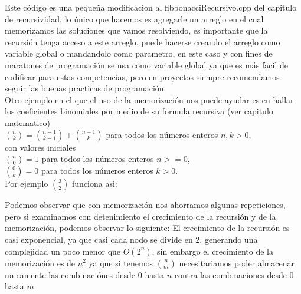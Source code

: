 Este código es una pequeña modificacion al fibbonacciRecursivo.cpp del capitulo de recursividad, lo único que hacemos es agregarle un arreglo en el cual memorizamos las soluciones que vamos resolviendo, es importante que la recursión tenga acceso a este arreglo, puede hacerse creando el arreglo como variable global o mandandolo como parametro, en este caso y con fines de maratones de programación se usa como variable global ya que es más facil de codificar para estas competencias, pero en proyectos siempre recomendamos seguir las buenas practicas de programación.
\\Otro ejemplo en el que el uso de la memorización nos puede ayudar es en hallar los coeficientes binomiales por medio de su formula recursiva (ver capitulo matematico)
\\${n \choose k} = {n-1 \choose k-1} + {n-1 \choose k}$ para todos los números enteros $n,k > 0$,
\\con valores iniciales
\\${n \choose 0}=1$ para todos los números enteros $n>=0$,
\\${0 \choose k}=0$ para todos los números enteros $k>0$.
\\Por ejemplo ${3 \choose 2}$ funciona asi:
\\

Podemos observar que con memorización nos ahorramos algunas repeticiones, pero si examinamos con detenimiento el crecimiento de la recursión y de la memorización, podemos observar lo siguiente:
El crecimiento de la recursión es casi exponencial, ya que casi cada nodo se divide en 2, generando una complejidad un poco menor que $O(2^n)$, sin embargo el crecimiento de la memorización es de $n^2$ ya que si tenemos ${n \choose m}$ necesitariamos poder almacenar unicamente las combinaciónes desde $0$ hasta $n$ contra las combinaciones desde $0$ hasta $m$.